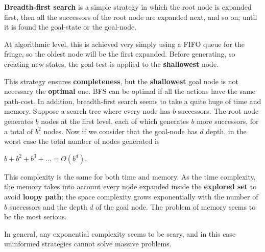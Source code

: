 \textbf{Breadth-first search} is a simple strategy in which the root node is expanded first, then all the successors of the root node are expanded next, and so on; until it is
found the goal-state or the goal-node. \vspace{3.5pt}

At algorithmic level, this is achieved very simply using a FIFO queue for the fringe, so the oldest node will be the first expanded. Before generating, so creating new states,
the goal-test is applied to the \textbf{shallowest} node. \vspace{3.5pt}

This strategy ensures \textbf{completeness}, but the \textbf{shallowest} goal node is not necessary the \textbf{optimal} one. BFS can be optimal if all the actions have the same 
path-cost. In addition, breadth-first search seems to take a quite huge of time and memory. Suppose a search tree where every node has $b$ successors. The root node generates
$b$ nodes at the first level, each of which generates $b$ more successors, for a total of $b^2$ nodes. Now if we consider that the goal-node has $d$ depth, in the worst case 
the total number of nodes generated is \vspace{3.5pt}
\begin{center}
    $b + b^2 + b^3 + \dots = O(b^d)$.
\end{center} \vspace{3.5pt}
This complexity is the same for both time and memory. As the time complexity, the memory takes into account every node expanded inside the \textbf{explored set} to avoid
\textbf{loopy path}; the space complexity grows exponentially with the number of $b$ successors and the depth $d$ of the goal node. The problem of memory seems to be the most serious. \vspace{3.5pt}

In general, any exponential complexity seems to be scary, and in this case uninformed strategies cannot solve massive problems.